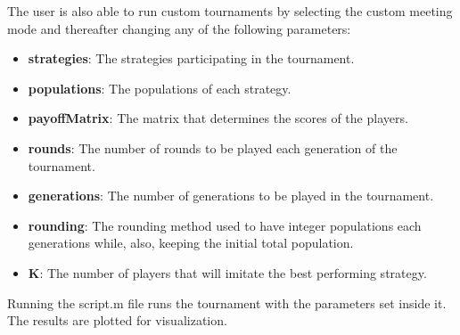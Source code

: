\documentclass[12pt]{article}
\begin{document}
The user is also able to run custom tournaments by selecting the custom meeting mode and thereafter changing any of the following parameters:
\begin{itemize}
    \item \textbf{strategies}: The strategies participating in the tournament. 
    \item \textbf{populations}: The populations of each strategy.
    \item \textbf{payoffMatrix}: The matrix that determines the scores of the players.
    \item \textbf{rounds}: The number of rounds to be played each generation of the tournament.
    \item \textbf{generations}: The number of generations to be played in the tournament.
    \item \textbf{rounding}: The rounding method used to have integer populations each generations while, also, keeping the initial total population.
    \item \textbf{K}: The number of players that will imitate the best performing strategy.
\end{itemize}
Running the script.m file runs the tournament with the parameters set inside it. The results are plotted for visualization.

\newpage
\end{document}
